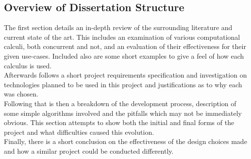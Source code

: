 \subsection{Overview of Dissertation Structure}

    The first section details an in-depth review of the surrounding literature and current state of the art.
    This includes an examination of various computational calculi, both concurrent and not, and an evaluation of their effectiveness for their given use-cases.
    Included also are some short examples to give a feel of how each calculus is used.\\

    Afterwards follows a short project requirements specification and investigation on technologies planned to be used in this project and justifications as to why each was chosen.\\

    Following that is then a breakdown of the development process, description of some simple algorithms involved and the pitfalls which may not be immediately obvious.
    This section attempts to show both the initial and final forms of the project and what difficulties caused this evolution.\\

    Finally, there is a short conclusion on the effectiveness of the design choices made and how a similar project could be conducted differently.\\
